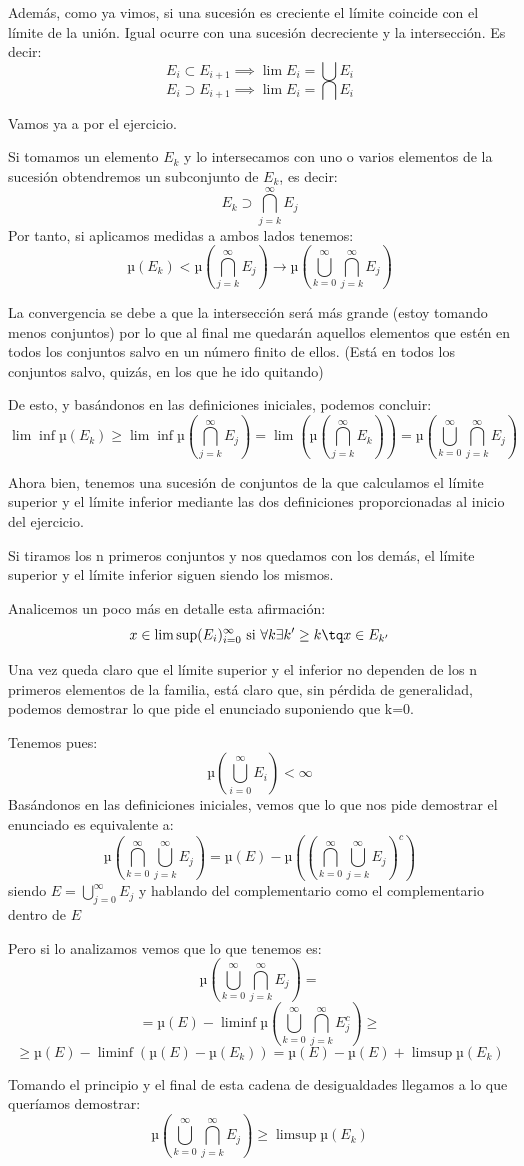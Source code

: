 \begin{problem}[6]
Además, como ya vimos, si una sucesión es creciente el límite coincide con el límite de la unión. Igual ocurre con una sucesión decreciente y la intersección. Es decir:
\[E_i \subset E_{i+1} \implies \lim E_i = \bigcup E_i\]
\[E_i \supset E_{i+1} \implies \lim E_i = \bigcap E_i\]


Vamos ya a por el ejercicio.

Si tomamos un elemento $E_k$ y lo intersecamos con uno o varios elementos de la sucesión obtendremos un subconjunto de $E_k$, es decir:
\[E_k \supset \bigcap_{j=k}^{\infty}E_j\]
Por tanto, si aplicamos medidas a ambos lados tenemos:
\[µ(E_k) < µ(\bigcap_{j=k}^{\infty}E_j) \rightarrow µ(\bigcup_{k=0}^{\infty}\bigcap_{j=k}^{\infty}E_j)\]

La convergencia se debe a que la intersección será más grande (estoy tomando menos conjuntos) por lo que al final me quedarán aquellos elementos que estén en todos los conjuntos salvo en un número finito de ellos. (Está en todos los conjuntos salvo, quizás, en los que he ido quitando)

De esto, y basándonos en las definiciones iniciales, podemos concluir:
\[\lim \inf µ(E_k) \geq \lim \inf µ(\bigcap_{j=k}^{\infty}E_j) = \lim (µ(\bigcap_{j=k}^{\infty}E_k))=µ(\bigcup_{k=0}^{\infty}\bigcap_{j=k}^{\infty}E_j)\]

Ahora bien, tenemos una sucesión de conjuntos de la que calculamos el límite superior y el límite inferior mediante las dos definiciones proporcionadas al inicio del ejercicio.

Si tiramos los n primeros conjuntos y nos quedamos con los demás, el límite superior y el límite inferior siguen siendo los mismos.

Analicemos un poco más en detalle esta afirmación:
\[x \in \lim \sup (E_i)_{i=0}^{\infty} \text{ si } \forall k \exists k' \geq k \tq x \in E_{k'}\]

Una vez queda claro que el límite superior y el inferior no dependen de los n primeros elementos de la familia, está claro que, sin pérdida de generalidad, podemos demostrar lo que pide el enunciado suponiendo que k=0.

Tenemos pues:
\[µ(\bigcup_{i=0}^{\infty} E_i)< \infty\]
Basándonos en las definiciones iniciales, vemos que lo que nos pide demostrar el enunciado es equivalente a:
\[µ(\bigcap_{k=0}^{\infty}\bigcup_{j=k}^{\infty}E_j)= µ(E)-µ((\bigcap_{k=0}^{\infty}\bigcup_{j=k}^{\infty}E_j)^c)\]
siendo $E=\bigcup_{j=0}^{\infty}E_j$ y hablando del complementario como el complementario dentro de $E$

Pero si lo analizamos vemos que lo que tenemos es:
\[µ(\bigcup_{k=0}^{\infty}\bigcap_{j=k}^{\infty}E_j)=\]
\[=µ(E)-\liminf µ(\bigcup_{k=0}^{\infty}\bigcap_{j=k}^{\infty}E^c_j) \geq \]
\[\geq µ(E)-\liminf(µ(E)-µ(E_k))=µ(E)-µ(E)+\limsup µ(E_k)\]

Tomando el principio y el final de esta cadena de desigualdades llegamos a lo que queríamos demostrar:
\[µ(\bigcup_{k=0}^{\infty}\bigcap_{j=k}^{\infty}E_j)\geq\limsup µ(E_k)\]
\end{problem}

